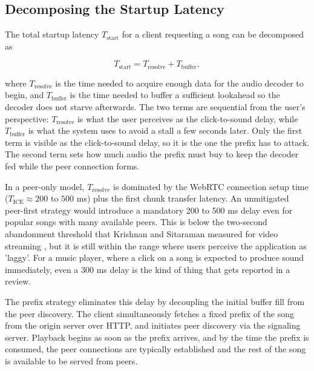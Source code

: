 \subsection{Decomposing the Startup Latency}
\label{subsec:latency-decomp}

\indent \par The total startup latency $T_{\text{start}}$ for a client requesting a song can be decomposed as

\begin{equation}
  T_{\text{start}} = T_{\text{resolve}} + T_{\text{buffer}},
  \label{eq:latency}
\end{equation}

where $T_{\text{resolve}}$ is the time needed to acquire enough data for the audio decoder to begin, and $T_{\text{buffer}}$ is the time needed to buffer a sufficient lookahead so the decoder does not starve afterwards. The two terms are sequential from the user's perspective: $T_{\text{resolve}}$ is what the user perceives as the click-to-sound delay, while $T_{\text{buffer}}$ is what the system uses to avoid a stall a few seconds later. Only the first term is visible as the click-to-sound delay, so it is the one the prefix has to attack. The second term sets how much audio the prefix must buy to keep the decoder fed while the peer connection forms.

\par In a peer-only model, $T_{\text{resolve}}$ is dominated by the WebRTC connection setup time ($T_{\text{ICE}} \approx 200$ to $500$ ms) plus the first chunk transfer latency. An unmitigated peer-first strategy would introduce a mandatory 200 to 500 ms delay even for popular songs with many available peers. This is below the two-second abandonment threshold that Krishnan and Sitaraman measured for video streaming \cite{quality_impact}, but it is still within the range where users perceive the application as 'laggy'. For a music player, where a click on a song is expected to produce sound immediately, even a 300 ms delay is the kind of thing that gets reported in a review.

\par The prefix strategy eliminates this delay by decoupling the initial buffer fill from the peer discovery. The client simultaneously fetches a fixed prefix of the song from the origin server over HTTP, and initiates peer discovery via the signaling server. Playback begins as soon as the prefix arrives, and by the time the prefix is consumed, the peer connections are typically established and the rest of the song is available to be served from peers.


